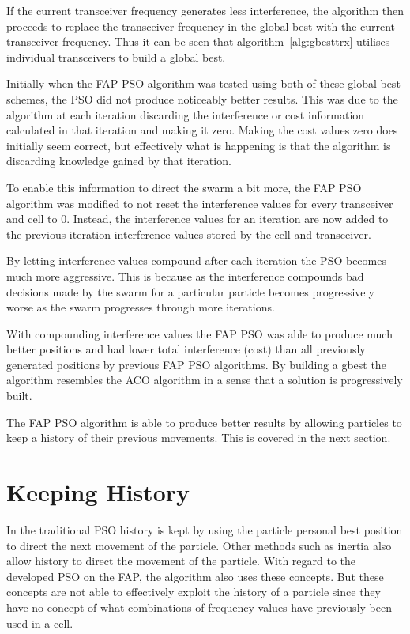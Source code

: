 If the current transceiver frequency generates less interference, the algorithm then proceeds to replace the transceiver frequency in the global best with the current transceiver frequency. Thus it can be seen that algorithm~\ref{alg:gbesttrx} utilises individual transceivers to build a global best.

Initially when the \gls{FAP} \gls{PSO} algorithm was tested using both of these global best schemes, the \gls{PSO} did not produce noticeably better results. This was due to the algorithm at each iteration discarding the interference or cost information calculated in that iteration and making it zero. Making the cost values zero does initially seem correct, but effectively what is happening is that the algorithm is discarding knowledge gained by that iteration.

To enable this information to direct the swarm a bit more, the \gls{FAP} \gls{PSO} algorithm was modified to not reset the interference values for every transceiver and cell to 0. Instead, the interference values for an iteration are now added to the previous iteration interference values stored by the cell and transceiver. 

By letting interference values compound after each iteration the \gls{PSO} becomes much more aggressive. This is because as the interference compounds bad decisions made by the swarm for a particular particle becomes progressively worse as the swarm progresses through more iterations.

With compounding interference values the \gls{FAP} \gls{PSO} was able to produce much better positions and had lower total interference (cost) than all previously generated positions by previous \gls{FAP} \gls{PSO} algorithms. By building a gbest the algorithm resembles the ACO algorithm in a sense that a solution is progressively built.

The \gls{FAP} \gls{PSO} algorithm is able to produce better results by allowing particles to keep a history of their previous movements. This is covered in the next section.
\section{Keeping History}
\label{sec:keepinghistory}
In the traditional \gls{PSO} history is kept by using the particle personal best position to direct the next movement of the particle. Other methods such as inertia also allow history to direct the movement of the particle. With regard to the developed \gls{PSO} on the \gls{FAP}, the algorithm also uses these concepts. But these concepts are not able to effectively exploit the history of a particle since they have no concept of what combinations of frequency values have previously been used in a cell.

